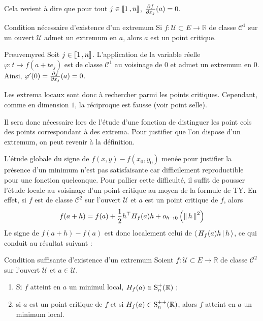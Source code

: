     Cela revient à dire que pour tout $j \in \intervalleEntier{1}{n}$, $\dpart{f}{x_j}(a) = 0$.

    \begin{theo}{Condition nécessaire d’existence d’un extremum}{}
        Si $f : \mathcal{U} \subset E \to \mathbb{R}$ de classe $\mathcal{C}^1$ sur un ouvert $\mathcal{U}$ admet un extremum en $a$, alors $a$ est un point critique.
    \end{theo}

    \begin{demo}{Preuve}{myred}
        Soit $j \in \intervalleEntier{1}{n}$. L’application de la variable réelle $\varphi : t \mapsto f(a + t e_j)$ est de classe $\mathcal{C}^1$ au voisinage de $0$ et admet un extremum en $0$. Ainsi, $\varphi'(0) = \dpart{f}{x_j}(a) = 0$.
    \end{demo}

    Les extrema locaux sont donc à rechercher parmi les points critiques. Cependant, comme en dimension $1$, la réciproque est fausse (voir point selle).

    Il sera donc nécessaire lors de l’étude d’une fonction de distinguer les point cols des points correspondant à des extrema. Pour justifier que l’on dispose d’un extremum, on peut revenir à la définition.

    L’étude globale du signe de $f(x,y) - f(x_0,y_0)$ menée pour justifier la présence d’un minimum n’est pas satisfaisante car difficilement reproductible pour une fonction quelconque. Pour pallier cette difficulté, il suffit de pousser l’étude locale au voisinage d’un point critique au moyen de la formule de TY. En effet, si $f$ est de classe $\mathcal{C}^2$ sur l’ouvert $\mathcal{U}$ et $a$ est un point critique de $f$, alors 
    \[ f(a+h) = f(a) + \frac{1}{2} h^{\top} H_f(a) h + \comp{o}{h}{0}{\norm{h}^2} \]    
    Le signe de $f(a+h) - f(a)$ est donc localement celui de $\spr{H_f(a)h}{h}$, ce qui conduit au résultat suivant : 

    \begin{theo}{Condition suffisante d’existence d’un extremum}{}
        Soient $f : \mathcal{U} \subset E \to \mathbb{R}$ de classe $\mathcal{C}^2$ sur l’ouvert $\mathcal{U}$ et $a \in \mathcal{U}$. 
        \begin{enumerate}
            \item Si $f$ atteint en $a$ un minimul local, $H_f(a) \in \S_n^+(\mathbb{R})$ ;
            \item si $a$ est un point critique de $f$ et si $H_f(a) \in \S_n^{++}(\mathbb{R})$, alors $f$ atteint en $a$ un minimum local.
        \end{enumerate}
    \end{theo}

